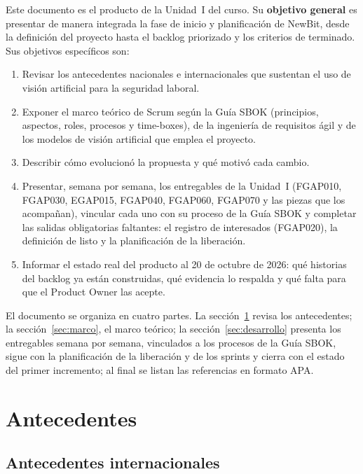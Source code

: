 \documentclass[12pt,a4paper]{article}
\begin{document}
Este documento es el producto de la Unidad~I del curso. Su \textbf{objetivo general} es presentar de manera integrada la fase de inicio y planificación de NewBit, desde la definición del proyecto hasta el backlog priorizado y los criterios de terminado. Sus objetivos específicos son:

\begin{enumerate}[label=\alph*)]
  \item Revisar los antecedentes nacionales e internacionales que sustentan el uso de visión artificial para la seguridad laboral.
  \item Exponer el marco teórico de Scrum según la Guía SBOK (principios, aspectos, roles, procesos y time-boxes), de la ingeniería de requisitos ágil y de los modelos de visión artificial que emplea el proyecto.
  \item Describir cómo evolucionó la propuesta y qué motivó cada cambio.
  \item Presentar, semana por semana, los entregables de la Unidad~I (FGAP010, FGAP030, EGAP015, FGAP040, FGAP060, FGAP070 y las piezas que los acompañan), vincular cada uno con su proceso de la Guía SBOK y completar las salidas obligatorias faltantes: el registro de interesados (FGAP020), la definición de listo y la planificación de la liberación.
  \item Informar el estado real del producto al 20 de octubre de 2026: qué historias del backlog ya están construidas, qué evidencia lo respalda y qué falta para que el Product Owner las acepte.
\end{enumerate}

El documento se organiza en cuatro partes. La sección~\ref{sec:antecedentes} revisa los antecedentes; la sección~\ref{sec:marco}, el marco teórico; la sección~\ref{sec:desarrollo} presenta los entregables semana por semana, vinculados a los procesos de la Guía SBOK, sigue con la planificación de la liberación y de los sprints y cierra con el estado del primer incremento; al final se listan las referencias en formato APA.

\FloatBarrier
\section{Antecedentes}\label{sec:antecedentes}

\FloatBarrier
\subsection{Antecedentes internacionales}
\end{document}
